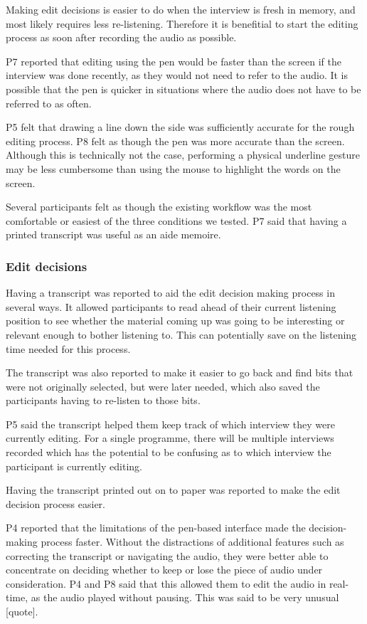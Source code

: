 Making edit decisions is easier to do when the interview is fresh in memory, and most likely requires less
re-listening. Therefore it is benefitial to start the editing process as soon after recording the audio as possible.

P7 reported that editing using the pen would be faster than the screen if the interview was done recently, as they
would not need to refer to the audio. It is possible that the pen is quicker in situations where the audio does not
have to be referred to as often.

P5 felt that drawing a line down the side was sufficiently accurate for the rough editing process. P8 felt as though
the pen was more accurate than the screen. Although this is technically not the case, performing a physical underline
gesture may be less cumbersome than using the mouse to highlight the words on the screen.

Several participants felt as though the existing workflow was the most comfortable or easiest of the three conditions
we tested. P7 said that having a printed transcript was useful as an aide memoire.

\subsubsection{Edit decisions}

Having a transcript was reported to aid the edit decision making process in several ways. It allowed participants to
read ahead of their current listening position to see whether the material coming up was going to be interesting or
relevant enough to bother listening to. This can potentially save on the listening time needed for this process.

The transcript was also reported to make it easier to go back and find bits that were not originally selected, but were
later needed, which also saved the participants having to re-listen to those bits.

P5 said the transcript helped them keep track of which interview they were currently editing. For a single programme,
there will be multiple interviews recorded which has the potential to be confusing as to which interview the
participant is currently editing.

Having the transcript printed out on to paper was reported to make the edit decision process easier.

P4 reported that the limitations of the pen-based interface made the decision-making process faster. Without the
distractions of additional features such as correcting the transcript or navigating the audio, they were better able to
concentrate on deciding whether to keep or lose the piece of audio under consideration. P4 and P8 said that this
allowed them to edit the audio in real-time, as the audio played without pausing. This was said to be very unusual
[quote].

